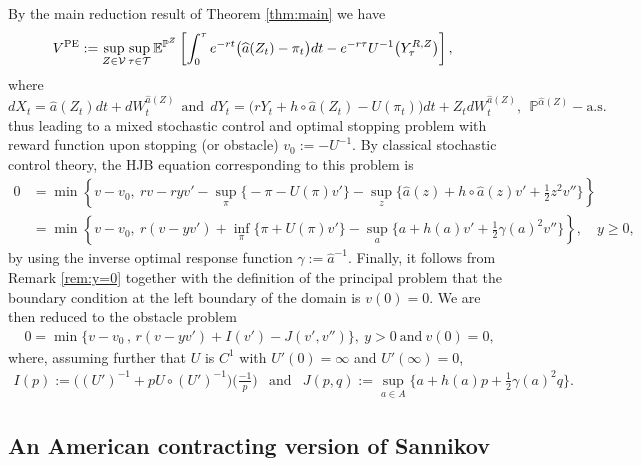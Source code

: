 \documentclass[11pt,a4paper]{article}
\numberwithin{equation}{section}
\def\dbE{\mathbb{E}}
\def\dbP{\mathbb{P}}
\newcommand{\cT}{\mathcal{T}}
\newcommand{\cV}{\mathcal{V}}
\newcommand{\bea}{\begin{eqnarray}}
\newcommand{\eea}{\end{eqnarray}}
\theoremstyle{definition}
\begin{document}
By the main reduction result of Theorem \ref{thm:main} we have
 \begin{align*}
   V^{\rm PE}
    &:= \sup_{Z\in\cV}\sup_{\tau\in\cT} 
         \dbE^{\dbP^{Z}}\left[\int_0^\tau e^{-r t}\big(\widehat a(Z_t)-\pi_t\big)dt
                                  -e^{-r \tau}U^{-1}\big(Y^{R,Z}_\tau\big)\right],        
 \end{align*}
where 
 $$
  dX_t = \widehat a(Z_t)dt + dW_t^{\widehat a(Z)}
   ~~\mbox{and}~~
  dY_t = \big(rY_t+h\circ\widehat a(Z_t)-U(\pi_t)\big)dt+ Z_t dW_t^{\widehat a(Z)},
    ~~\dbP^{\widehat\alpha(Z)}-\mbox{a.s.}
 $$
thus leading to a mixed stochastic control and optimal stopping problem with reward function upon stopping (or obstacle) $v_0:=-U^{-1}$. By classical stochastic control theory, the HJB equation corresponding to this problem is
 \begin{align}
  0 &= \min\left\{v-v_0,~
                  r v-ryv' -\sup_{\pi}\big\{-\pi-U(\pi)v'\big\}
                           -\sup_{z}\Big\{\hat a(z)+h\circ\widehat a(z)v'+\frac12 z^2 v''\Big\}
            \right\} \nonumber \\
    &= \min\left\{v-v_0,~
                  r(v-yv') +\inf_{\pi}\big\{\pi+U(\pi)v'\big\}
                           -\sup_{a}\Big\{a+h(a)v'+\frac12 \gamma(a)^2v''\Big\}
           \right\}, \quad y\geq 0, \nonumber
 \end{align}
 by using the inverse optimal response function $\gamma:=\widehat a^{-1}$. 
Finally, it follows from Remark \ref{rem:y=0} together with the definition of the principal problem that the boundary condition at the left boundary of the domain is $v(0)=0$. 
We are then reduced to the obstacle problem
 \bea\label{DPE:Sannokov} 
 0
 =
 \min\!\Big\{ v-v_0
                  \,,\,
                  r (v-yv')+I(v')-J(v',v'')
         \Big\}, 
 ~
 y\!>\!0
 ~\mbox{and}~v(0)=0,
 \eea
where, assuming further that $U$ is $C^1$ with $U'(0)=\infty$ and $U'(\infty)=0$, 
 \bea\label{IJ}
 I(p):=\big((U')^{-1}+p U\!\circ\!(U')^{-1}\big)\Big(\frac{-1}{p}\Big)
 &\mbox{and}&
 J(p,q):=\sup_{a\in A} \Big\{a+h(a)p\!+\!\frac12 \gamma(a)^2 q\Big\}.
 \eea

\subsection{An American contracting version of Sannikov \cite{Sannikov08}}
\end{document}
